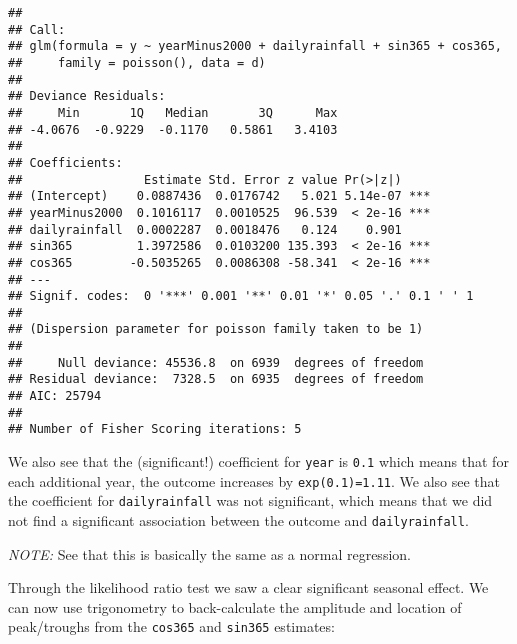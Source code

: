 \documentclass[]{book}
\begin{document}
\begin{verbatim}
## 
## Call:
## glm(formula = y ~ yearMinus2000 + dailyrainfall + sin365 + cos365, 
##     family = poisson(), data = d)
## 
## Deviance Residuals: 
##     Min       1Q   Median       3Q      Max  
## -4.0676  -0.9229  -0.1170   0.5861   3.4103  
## 
## Coefficients:
##                 Estimate Std. Error z value Pr(>|z|)    
## (Intercept)    0.0887436  0.0176742   5.021 5.14e-07 ***
## yearMinus2000  0.1016117  0.0010525  96.539  < 2e-16 ***
## dailyrainfall  0.0002287  0.0018476   0.124    0.901    
## sin365         1.3972586  0.0103200 135.393  < 2e-16 ***
## cos365        -0.5035265  0.0086308 -58.341  < 2e-16 ***
## ---
## Signif. codes:  0 '***' 0.001 '**' 0.01 '*' 0.05 '.' 0.1 ' ' 1
## 
## (Dispersion parameter for poisson family taken to be 1)
## 
##     Null deviance: 45536.8  on 6939  degrees of freedom
## Residual deviance:  7328.5  on 6935  degrees of freedom
## AIC: 25794
## 
## Number of Fisher Scoring iterations: 5
\end{verbatim}

We also see that the (significant!) coefficient for \texttt{year} is
\texttt{0.1} which means that for each additional year, the outcome
increases by \texttt{exp(0.1)=1.11}. We also see that the coefficient
for \texttt{dailyrainfall} was not significant, which means that we did
not find a significant association between the outcome and
\texttt{dailyrainfall}.

\emph{NOTE:} See that this is basically the same as a normal regression.

\newpage

Through the likelihood ratio test we saw a clear significant seasonal
effect. We can now use trigonometry to back-calculate the amplitude and
location of peak/troughs from the \texttt{cos365} and \texttt{sin365}
estimates:
\end{document}
